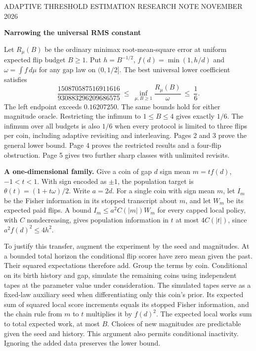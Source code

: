\documentclass[11pt]{article}
\newcommand{\heading}[1]{{\LARGE\bfseries\color{ink} #1}\par\smallskip}
\begin{document}
{\small\color{ink} ADAPTIVE THRESHOLD ESTIMATION \hfill RESEARCH NOTE  NOVEMBER 2026}\par
\heading{Narrowing the universal RMS constant}
Let $R_\mu(B)$ be the ordinary minimax root-mean-square error at uniform expected flip budget $B\ge1$. Put $h=B^{-1/2}$, $f(d)=\min(1,h/d)$ and $\omega=\int f\,d\mu$ for any gap law on $(0,1/2]$. The best universal lower coefficient satisfies
\[
 \frac{150870587516911616}{930883296209686575}
 \ \le\ \inf_{\mu,B\ge1}\frac{R_\mu(B)}{\omega}
 \ \le\ \frac16 .
\]
The left endpoint exceeds $0.16207250$. The same bounds hold for either magnitude oracle. Restricting the infimum to $1\le B\le4$ gives exactly $1/6$. The infimum over all budgets is also $1/6$ when every protocol is limited to three flips per coin, including adaptive revisiting and interleaving. Pages 2 and 3 prove the general lower bound. Page 4 proves the restricted results and a four-flip obstruction. Page 5 gives two further sharp classes with unlimited revisits.

\textbf{A one-dimensional family.} Give a coin of gap $d$ sign mean $m=t f(d)$, $-1<t<1$. With sign encoded as $\pm1$, the population target is $\theta(t)=(1+t\omega)/2$. Write $a=2d$. For a single coin with sign mean $m$, let $I_m$ be the Fisher information in its stopped transcript about $m$, and let $W_m$ be its expected paid flips. A bound $I_m\le a^2 C(|m|)W_m$ for every capped local policy, with $C$ nondecreasing, gives population information in $t$ at most $4C(|t|)$, since $a^2 f(d)^2\le4h^2$.

To justify this transfer, augment the experiment by the seed and magnitudes. At a bounded total horizon the conditional flip scores have zero mean given the past. Their squared expectations therefore add. Group the terms by coin. Conditional on its birth history and gap, simulate the remaining coins using independent tapes at the parameter value under consideration. The simulated tapes serve as a fixed-law auxiliary seed when differentiating only this coin's prior. Its expected sum of squared local score increments equals its stopped Fisher information, and the chain rule from $m$ to $t$ multiplies it by $f(d)^2$. The expected local works sum to total expected work, at most $B$. Choices of new magnitudes are predictable given the seed and history. This argument also permits conditional inactivity. Ignoring the added data preserves the lower bound.
\end{document}
